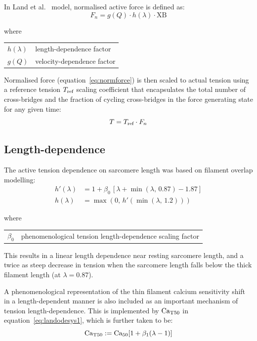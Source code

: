\vspace{0.3cm}
In Land et al.~\cite{Land:2012} model, normalised active force is defined as:
%
\begin{equation}\label{eq:normforce}
    F_n = g(Q)\cdot h(\lambda)\cdot \text{XB}
\end{equation}

\noindent
where

\vspace{0.2cm}
\begin{tabular}{ll}
    $h(\lambda)$ & length-dependence factor \\
    $g(Q)$       & velocity-dependence factor
\end{tabular}

\vspace{0.3cm}\noindent
Normalised force (equation~\eqref{eq:normforce}) is then scaled to actual tension using a reference tension $T_{\textrm{ref}}$ scaling coefficient that encapsulates the total number of cross-bridges and the fraction of cycling cross-bridges in the force generating state for any given time:
%
\begin{equation}
    T = T_{\textrm{ref}}\cdot F_n
\end{equation}
 
%
%
%
\subsection{Length-dependence}
The active tension dependence on sarcomere length was based on filament overlap modelling:
%
\begin{align}
    h'(\lambda) &= 1+\beta_0\,[\lambda+\min(\lambda,\,0.87)-1.87] \\
    h(\lambda) &= \max(0,\,h'(\min(\lambda,\,1.2)))
\end{align}

\noindent
where

\vspace{0.2cm}
\begin{tabular}{ll}
    $\beta_0$ & phenomenological tension length-dependence scaling factor
\end{tabular}

\vspace{0.3cm}\noindent
This results in a linear length dependence near resting sarcomere length, and a twice as steep decrease in tension when the sarcomere length falls below the thick filament length (at $\lambda = 0.87$).

\vspace{0.2cm}
A phenomenological representation of the thin filament calcium sensitivity shift in a length-dependent manner is also included as an important mechanism of tension length-dependence. This is implemented by $\textrm{Ca}_{\textrm{T}50}$ in equation~\eqref{eq:landodesys1}, which is further taken to be:
%
\begin{equation}\label{eq:Caift}
    \textrm{Ca}_{\textrm{T}50}:=\textrm{Ca}_{50}[1 + \beta_1(\lambda - 1)]
\end{equation}

